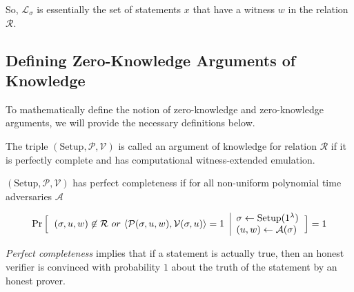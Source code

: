 So, $\mathcal{L}_{\sigma}$ is essentially the set of statements $x$ that have a witness $w$ in the relation $\mathcal{R}$. 

\subsection{Defining Zero-Knowledge Arguments of Knowledge}
\label{subsec:zka/d_aok}
To mathematically define the notion of zero-knowledge and zero-knowledge arguments, we will provide the necessary definitions below.

\begin{defn}
        The triple $(\text{Setup}, \mathcal{P}, \mathcal{V})$ is called an argument of knowledge for relation $\mathcal{R}$ if it is perfectly complete and has computational witness-extended emulation.
\end{defn}

\begin{defn}
    $(\text{Setup}, \mathcal{P}, \mathcal{V})$ has perfect completeness if for all non-uniform polynomial time adversaries $\mathcal{A}$

    \begin{equation*}
    \Pr 
    \Big[
    \begin{tabular}{c | l}
         \multirow{2}{*}{$(\sigma, u, w) \not \in \mathcal{R} \ or \ 
         \langle \mathcal{P}(\sigma, u, w), \mathcal{V}(\sigma, u) \rangle = 1$}
         & $\sigma \leftarrow \text{Setup}(1^{\lambda})$
         \\
         & 
         $(u, w) \leftarrow \mathcal{A}(\sigma)$
    \end{tabular}
    \Big] 
    = 1
\end{equation*}
\end{defn}

\emph{Perfect completeness} implies that if a statement is actually true, then an honest verifier is convinced with probability $1$ about the truth of the statement by an honest prover.

